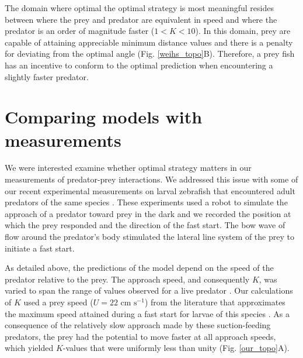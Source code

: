 \documentclass[12pt]{article}
\begin{document}
The domain where optimal the optimal strategy is most meaningful resides between where the prey and predator are equivalent in speed and where the predator is an order of magnitude faster ($1<K<10$). In this domain, prey are capable of attaining appreciable minimum distance values and there is a penalty for deviating from the optimal angle (Fig. \ref{weihs_topo}B). Therefore, a prey fish has an incentive to conform to the optimal prediction when encountering a slightly faster predator.

\section{Comparing models with measurements}

We were interested examine whether optimal strategy matters in our measurements of predator-prey interactions. We addressed this issue with some of our recent experimental measurements on larval zebrafish that encountered adult predators of the same species \citep{Stewart:2014cm}. These experiments used a robot to simulate the approach of a predator toward prey in the dark and we recorded the position at which the prey responded and the direction of the fast start. The bow wave of flow around the predator's body stimulated the lateral line system of the prey to initiate a fast start. 

As detailed above, the predictions of the model depend on the speed of the predator relative to the prey. The approach speed, and consequently $K$, was varied to span the range of values observed for a live predator \citep{Stewart:2013bh}. Our calculations of $K$ used a prey speed ($U=22 \text{ cm s}^{-1}$) from the literature that approximates the maximum speed attained during a fast start for larvae of this species \citep{Budick:2000wrb, Muller:2004hp}. As a consequence of the relatively slow approach made by these suction-feeding predators, the prey had the potential to move faster at all approach speeds, which yielded $K$-values that were uniformly less than unity (Fig. \ref{our_topo}A).
\end{document}
